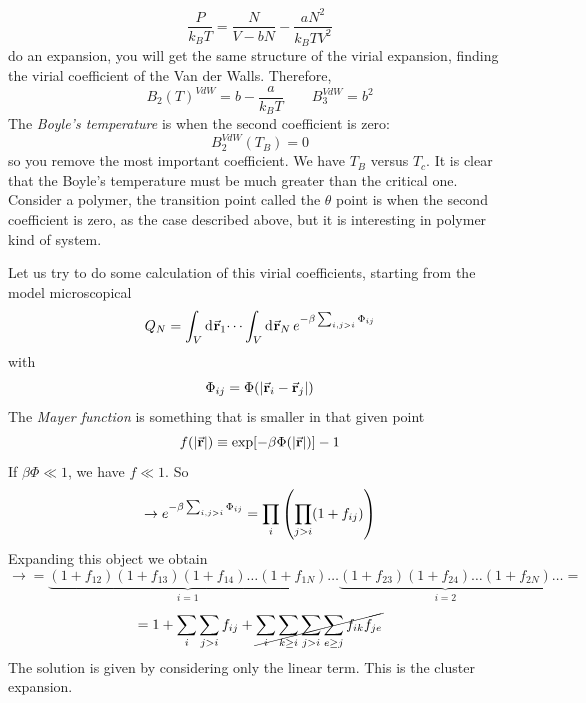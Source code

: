 \documentclass[../main/main.tex]{subfiles}
\begin{document}
\begin{equation}
  \frac{P}{k_B T} = \frac{N}{V-bN} - \frac{a N^2}{k_B T V^2}
\end{equation}
do an expansion, you will get the same structure of the virial expansion, finding the virial coefficient of the Van der Walls. Therefore,
\begin{equation}
  B_2 (T)^{VdW} = b - \frac{a}{k_B T} \qquad B_3^{VdW} = b^2
\end{equation}
The \emph{Boyle's temperature} is when the second coefficient is zero:
\begin{equation}
  B_2^{VdW} (T_B) = 0
\end{equation}
so you remove the most important coefficient.
We have \( T_B \) versus \( T_c \). It is clear that the Boyle's temperature must be much greater than the critical one. Consider a polymer, the transition point called the \( \theta  \) point is when the second coefficient is zero, as the case described above, but it is interesting in polymer kind of system.

Let us try to do some calculation of this virial coefficients, starting from the model microscopical
\begin{equation}
  Q_N = \int_{V}^{} \dd[]{\va{r}_1} \dots \int_{V}^{} \dd[]{\va{r}_N}  e^{-\beta \sum_{i,j > i}^{} \Phi _{ij} }
\end{equation}
with
\begin{equation}
  \Phi _{ij} = \Phi ( \abs{\va{r}_i - \va{r}_j} )
\end{equation}
The \emph{Mayer function}  is something that is smaller in that given point
\begin{equation}
  f (\abs{\va{r}} ) \equiv \exp [ - \beta \Phi ( \abs{\va{r}} )] -1
\end{equation}
If \( \beta \Phi \ll 1 \), we have \( f \ll 1 \). So
\begin{equation}
  \rightarrow  e^{-\beta \sum_{i,j > i}^{} \Phi _{ij} } = \prod_{i}^{} \qty(\prod_{j>i}^{} (1+ f_{ij})  )
\end{equation}
Expanding this object we obtain
\begin{equation}
  \rightarrow = \underbrace{(1+f_{12})(1+f_{13}) (1+ f_{14}) \dots ( 1 + f_{1N })}_{i=1}   \dots \underbrace{(1+f_{23}) (1+ f_{24}) \dots ( 1 + f_{2N })}_{i=2} \dots =
\end{equation}
\begin{equation}
  = 1 + \sum_{i}^{} \sum_{j>i}^{} f_{ij} + \cancel{\sum_{i}^{} \sum_{k \ge i}^{} \sum_{j > i}^{} \sum_{e \ge j}^{} f_{ik} f_{je}       }  
\end{equation}
The solution is given by considering only the linear term. This is the cluster expansion.
\end{document}
